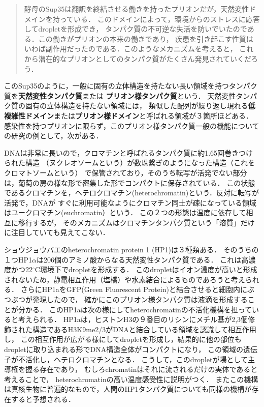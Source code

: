 \documentclass[uplatex,dvipdfmx]{jsarticle}
\begin{document}
\begin{quote}
    酵母のSup35は翻訳を終結させる働きを持ったプリオンだが，天然変性ドメインを持っている．
    このドメインによって，環境からのストレスに応答してdropletを形成でき，
    タンパク質の不可逆な失活を防いでいたのである．この働きがプリオンの本来の働きであり，
    疾患を引き起こす性質はいわば副作用だったのである．このようなメカニズムを考えると，
    これから潜在的なプリオンとしてのタンパク質がたくさん発見されていくだろう．\cite{白木賢太郎}
\end{quote}

このSup35のように，一般に固有の立体構造を持たない長い領域を持つタンパク質を\textbf{天然変性タンパク質}または
\textbf{プリオン様タンパク質}という．
天然変性タンパク質の固有の立体構造を持たない領域には，
類似した配列が繰り返し現れる\textbf{低複雑性ドメイン}または\textbf{プリオン様ドメイン}と呼ばれる領域が３箇所ほどある．
感染性を持つプリオンに限らず，このプリオン様タンパク質一般の機能についての研究の例として，次がある．

DNAは非常に長いので，クロマチンと呼ばれるタンパク質に約1.65回巻きつけられた構造
（ヌクレオソームという）が数珠繋ぎのようになった構造（これをクロマトソームという）
で保管されており，そのうち転写が活発でない部分は，葡萄の房の様な形で密集した形でコンパクトに保存されている．
この状態であるクロマチンを，ヘテロクロマチン(heterochromatin)という．反対に転写が活発で，DNAが
すぐに利用可能なようにクロマチン同士が疎になっている領域はユークロマチン(euchromatin）という．
この２つの形態は温度に依存して相互に移行するが，
そのメカニズムはクロマチンタンパク質という「溶質」だけに注目していても見えてこない．

ショウジョウバエのheterochromatin protein 1 (HP1)は３種類ある．
そのうちの１つHP1$\alpha$は206個のアミノ酸からなる天然変性タンパク質である．
これは高濃度かつ22$^\circ\mathrm{C}$環境下でdropletを形成する\cite{HP1a}．
このdropletはイオン濃度が高いと形成されないため，静電相互作用（塩橋）や水素結合によるものであろうと考えられる．
さらにHP1aをGFP(Green Fluorescent Protein)と結合させると細胞内にぶつぶつが発現したので，
確かにこのプリオン様タンパク質は液滴を形成することが分かる．
このHP1aは次の様にしてheterochromatinの不活化機構を担っていると考えられる．
HP1aは，ヒストンH3の９番目のリシンにメチル基が2,3個修飾された構造であるH3K9me2/3がDNAと結合している領域を認識して相互作用し，
この相互作用が広がる様にしてdropletを形成し，結果的に他の部位もdropletに取り込まれる形でDNA構造全体がコンパクトになり，
この領域の遺伝子が不活化し，ヘテロクロマチンとなる．
こうして，このdropletが場として主導権を握る存在であり，
むしろchromatinはそれに流されるだけの実体であると考えることで，
heterochromatinの高い温度感受性に説明がつく．
またこの機構は真核生物に普遍的なもので，人間のHP1タンパク質についても同様の機構が存在すると予想される\cite{HP1a-human}．
\end{document}
